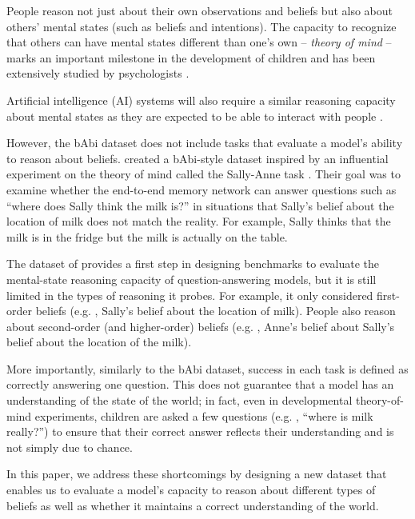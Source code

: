 People reason not just about their own observations and beliefs but also about others' mental states (such as beliefs and intentions). The capacity to recognize that others can have mental states different than one's own --
\textit{theory of mind} -- marks an important milestone in the development of children and has been extensively studied by psychologists \citep[for a review, see][]{flavell.2004}.   

Artificial intelligence (AI) systems will also require a similar reasoning capacity about mental states as they are expected to be able to interact with people \citep[e.g. ,][]{chandrasekaran2017takes, grant.etal.2017,rabinowitz.etal.2018}.

However, the bAbi dataset does not include tasks that evaluate a model's ability to reason about beliefs.  \citet{grant.etal.2017} created a bAbi-style dataset inspired by an influential experiment on the theory of mind called the Sally-Anne task \citep[e.g. ][]{baron1985does}. Their goal was to examine whether the end-to-end memory network \citep{sukhbaatar2015end} can answer questions such as ``where does Sally think the milk is?'' in situations that Sally's belief about the location of milk does not match the reality. For example, Sally thinks that the milk is in the fridge but the milk is actually on the table.

The dataset of \citet{grant.etal.2017} provides a first step in designing benchmarks to evaluate the mental-state reasoning capacity of question-answering models, but it is still limited in the types of reasoning it probes. For example, it only considered first-order beliefs (e.g. , Sally's belief about the location of milk). People also reason about second-order (and higher-order) beliefs (e.g. , Anne's belief about Sally's belief about the location of the milk). 

More importantly, similarly to the bAbi dataset, success in each task is defined as correctly answering one question. This does not guarantee that a model has an understanding of the state of the world; in fact, even in developmental theory-of-mind experiments, children are asked a few questions (e.g. , ``where is milk really?'') to ensure that their correct answer reflects their understanding and is not simply due to chance. 

In this paper, we address these shortcomings by designing a new dataset that enables us to evaluate a model's capacity to reason about different types of beliefs as well as whether it maintains a correct understanding of the world.

